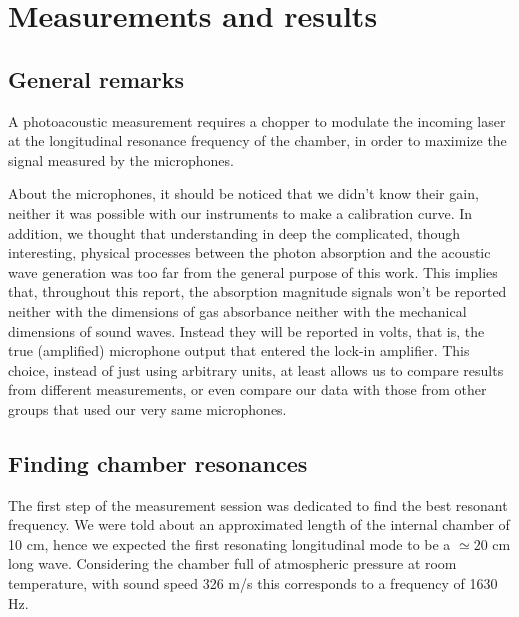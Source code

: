 \chapter{Measurements and results}
\section{General remarks}
A photoacoustic measurement requires a chopper to modulate the incoming laser at the longitudinal resonance frequency of the chamber, in order to maximize the signal measured by the microphones.

About the microphones, it should be noticed that we didn't know their gain, neither it was possible with our instruments to make a calibration curve. In addition, we thought that understanding in deep the complicated, though interesting, physical processes between the photon absorption and the acoustic wave generation was too far from the general purpose of this work. This implies that, throughout this report, the absorption magnitude signals won't be reported neither with the dimensions of gas absorbance neither with the mechanical dimensions of sound waves. Instead they will be reported in volts, that is, the true (amplified) microphone output that entered the lock-in amplifier. This choice, instead of just using arbitrary units, at least allows us to compare results from different measurements, or even compare our data with those from other groups that used our very same microphones.
\section{Finding chamber resonances}
The first step of the measurement session was dedicated to find the best resonant frequency. We were told about an approximated length of the internal chamber of 10 cm, hence we expected the first resonating longitudinal mode to be a $\simeq20$ cm long wave. Considering the chamber full of atmospheric pressure  at room temperature, with sound speed 326 m/s this corresponds to a frequency of 1630 Hz.

